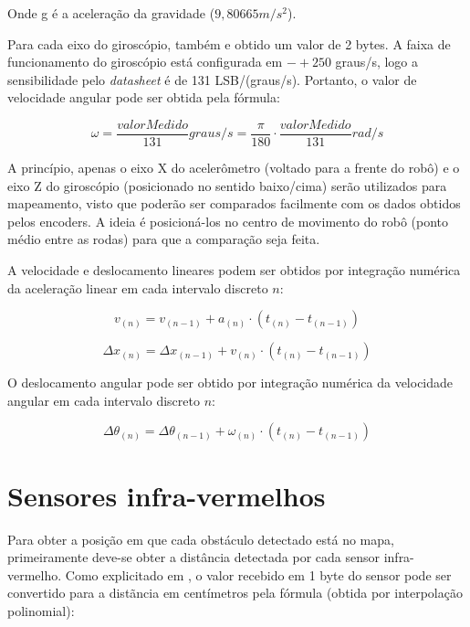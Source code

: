 Onde g é a aceleração da gravidade ($9,80665 \unit{m/s^2}$). 

Para cada eixo do giroscópio, também e obtido um valor de 2 bytes. A faixa de funcionamento do giroscópio está configurada em $-+250$ graus/s, logo a sensibilidade pelo \textit{datasheet} é de 131 LSB/(graus/s). Portanto, o valor de velocidade angular pode ser obtida pela fórmula:

\begin{equation}
  \omega = \frac{valorMedido}{131} \unit{graus/s} = \frac{\pi}{180} \cdot \frac{valorMedido}{131} \unit{rad/s}
  \label{eq:giro}
\end{equation}


A princípio, apenas o eixo X do acelerômetro (voltado para a frente do robô) e o eixo Z do giroscópio (posicionado no sentido baixo/cima) serão utilizados para mapeamento, visto que poderão ser comparados facilmente com os dados obtidos pelos encoders. A ideia é posicioná-los no centro de movimento do robô (ponto médio entre as rodas) para que a comparação seja feita.

A velocidade e deslocamento lineares podem ser obtidos por integração numérica da aceleração linear em cada intervalo discreto $n$:

\begin{equation}
  v_{(n)} = v_{(n - 1)} + a_{(n)} \cdot (t_{(n)} - t_{(n-1)})
  \label{eq:v_acel}
\end{equation}

\begin{equation}
  \Delta x_{(n)} = \Delta x_{(n - 1)} + v_{(n)} \cdot (t_{(n)} - t_{(n-1)})
  \label{eq:v_acel}
\end{equation}

O deslocamento angular pode ser obtido por integração numérica da velocidade angular em cada intervalo discreto $n$:

\begin{equation}
  \Delta \theta_{(n)} = \Delta \theta_{(n - 1)} + \omega_{(n)} \cdot (t_{(n)} - t_{(n-1)})
  \label{eq:v_acel}
\end{equation}



\section{Sensores infra-vermelhos}

Para obter a posição em que cada obstáculo detectado está no mapa, primeiramente deve-se obter a distância detectada por cada sensor infra-vermelho. Como explicitado em \cite{bellator_2012}, o valor recebido em 1 byte do sensor pode ser convertido para a distãncia em centímetros pela fórmula (obtida por interpolação polinomial):

